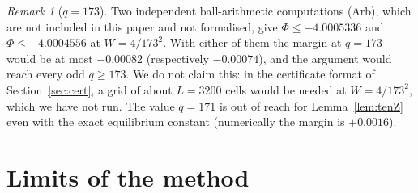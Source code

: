 \documentclass[11pt]{amsart}
\theoremstyle{definition}
\theoremstyle{remark}
\newtheorem{remark}[theorem]{Remark}
\numberwithin{equation}{section}
\begin{document}
\begin{remark}[$q=173$]\label{rem:173}
Two independent ball-arithmetic computations (Arb), which are not included in this paper and not formalised, give
$\Phi\le-4.0005336$ and $\Phi\le-4.0004556$ at $W=4/173^2$. With either of them the margin at $q=173$ would be at most
$-0.00082$ (respectively $-0.00074$), and the argument would reach every odd $q\ge173$. We do not claim this: in the
certificate format of Section~\ref{sec:cert}, a grid of about $L=3200$ cells would be needed at $W=4/173^2$, which we
have not run. The value $q=171$ is out of reach for
Lemma~\ref{lem:tenZ} even with the exact equilibrium constant (numerically the margin is $+0.0016$).
\end{remark}

\section{Limits of the method}\label{sec:limits}
\end{document}
